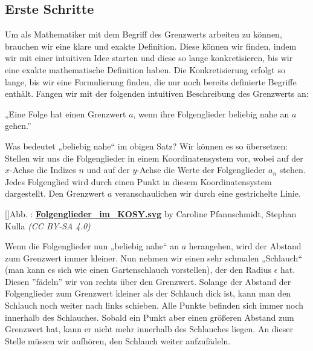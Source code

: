 \documentclass[fontsize=9pt,
               parskip=half-,
               DIV=14,
               listof=chapterentry,
               tocflat]{scrbook}
\newcounter{imagelabel}
\begin{document}
\subsection{Erste Schritte}

Um als Mathematiker mit dem Begriff des Grenzwerts arbeiten zu können, brauchen wir eine klare und exakte Definition. Diese können wir finden, indem wir mit einer intuitiven Idee starten und diese so lange konkretisieren, bis wir eine exakte mathematische Definition haben. Die Konkretisierung erfolgt so lange, bis wir eine Formulierung finden, die nur noch bereits definierte Begriffe enthält. Fangen wir mit der folgenden intuitiven Beschreibung des Grenzwerts an:

\begin{importantparagraph*}
„Eine Folge hat einen Grenzwert $a$, wenn ihre Folgenglieder beliebig nahe an $a$ gehen.”

\end{importantparagraph*}

Was bedeutet „beliebig nahe“ im obigen Satz? Wir können es so übersetzen: Stellen wir uns die Folgenglieder in einem Koordinatensystem vor, wobei auf der $x$-Achse die Indizes $n$ und auf der $y$-Achse die Werte der Folgenglieder $a_{n}$ stehen. Jedes Folgenglied wird durch einen Punkt in diesem Koordinatensystem dargestellt. Den Grenzwert $a$ veranschaulichen wir durch eine gestrichelte Linie.

[]{Abb. : \protect\href{https://commons.wikimedia.org/wiki/File:Folgenglieder_im_KOSY.svg}{\textbf{Folgenglieder\allowbreak\_im\allowbreak\_KOSY.svg}} by Caroline Pfannschmidt, Stephan Kulla \textit{(CC BY-SA 4.0)}}\begin{center}
\end{center}

Wenn die Folgenglieder nun „beliebig nahe“ an $a$ herangehen, wird der Abstand zum Grenzwert immer kleiner. Nun nehmen wir einen sehr schmalen „Schlauch“ (man kann es sich wie einen Gartenschlauch vorstellen), der den Radius $\epsilon $ hat. Diesen {''}fädeln{''} wir von rechts über den Grenzwert. Solange der Abstand der Folgenglieder zum Grenzwert kleiner als der Schlauch dick ist, kann man den Schlauch noch weiter nach links schieben. Alle Punkte befinden sich immer noch innerhalb des Schlauches. Sobald ein Punkt aber einen größeren Abstand zum Grenzwert hat, kann er nicht mehr innerhalb des Schlauches liegen. An dieser Stelle müssen wir aufhören, den Schlauch weiter aufzufädeln.
\end{document}
